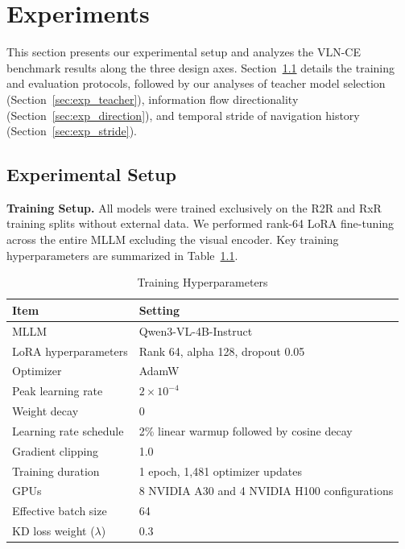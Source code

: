 \chapter{Experiments}
\label{ch:experiments}

This section presents our experimental setup and analyzes the VLN-CE benchmark results along the three design axes. Section~\ref{sec:exp_setup} details the training and evaluation protocols, followed by our analyses of teacher model selection (Section~\ref{sec:exp_teacher}), information flow directionality (Section~\ref{sec:exp_direction}), and temporal stride of navigation history (Section~\ref{sec:exp_stride}).

\section{Experimental Setup}
\label{sec:exp_setup}

\textbf{Training Setup.} All models were trained exclusively on the R2R and RxR training splits without external data. We performed rank-64 LoRA fine-tuning across the entire MLLM excluding the visual encoder. Key training hyperparameters are summarized in Table~\ref{tab:hyperparams}.

\begin{table}[t]
    \centering
    \caption{Training Hyperparameters}
    \label{tab:hyperparams}
    \begin{tabular}{ll}
        \toprule
        Item & Setting \\
        \midrule
        MLLM & Qwen3-VL-4B-Instruct \\
        LoRA hyperparameters & Rank 64, alpha 128, dropout 0.05 \\
        Optimizer & AdamW \\
        Peak learning rate & $2 \times 10^{-4}$ \\
        Weight decay & 0 \\
        Learning rate schedule & 2\% linear warmup followed by cosine decay \\
        Gradient clipping & 1.0 \\
        Training duration & 1 epoch, 1,481 optimizer updates \\
        GPUs & 8 NVIDIA A30 and 4 NVIDIA H100 configurations \\
        Effective batch size & 64 \\
        KD loss weight ($\lambda$) & 0.3 \\
        \bottomrule
    \end{tabular}
\end{table}

